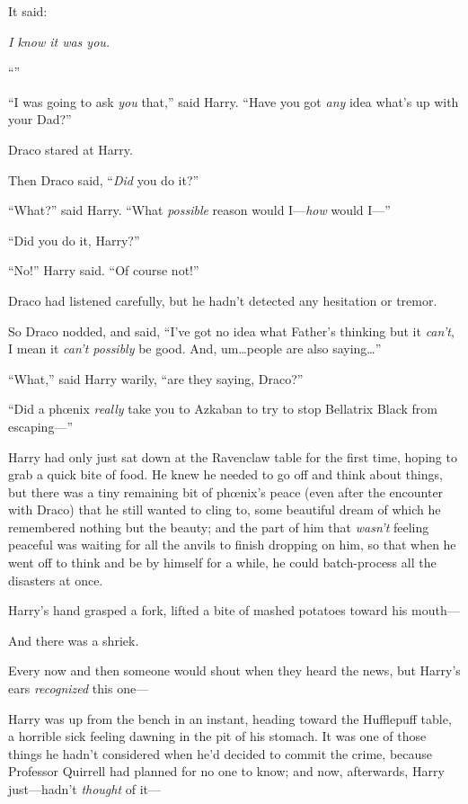 It said:

\emph{I know it was you.}

“\emph{}”

“I was going to ask \emph{you} that,” said Harry. “Have you got \emph{any} idea what’s up with your Dad?”

Draco stared at Harry.

Then Draco said, “\emph{Did} you do it?”

“What?” said Harry. “What \emph{possible} reason would I—\emph{how} would I—”

“Did you do it, Harry?”

“No!” Harry said. “Of course not!”

Draco had listened carefully, but he hadn’t detected any hesitation or tremor.

So Draco nodded, and said, “I’ve got no idea what Father’s thinking but it \emph{can’t}, I mean it \emph{can’t possibly} be good. And, um…people are also saying…”

“What,” said Harry warily, “are they saying, Draco?”

“Did a phœnix \emph{really} take you to Azkaban to try to stop Bellatrix Black from escaping—”


Harry had only just sat down at the Ravenclaw table for the first time, hoping to grab a quick bite of food. He knew he needed to go off and think about things, but there was a tiny remaining bit of phœnix’s peace (even after the encounter with Draco) that he still wanted to cling to, some beautiful dream of which he remembered nothing but the beauty; and the part of him that \emph{wasn’t} feeling peaceful was waiting for all the anvils to finish dropping on him, so that when he went off to think and be by himself for a while, he could batch-process all the disasters at once.

Harry’s hand grasped a fork, lifted a bite of mashed potatoes toward his mouth—

And there was a shriek.

Every now and then someone would shout when they heard the news, but Harry’s ears \emph{recognized} this one—

Harry was up from the bench in an instant, heading toward the Hufflepuff table, a horrible sick feeling dawning in the pit of his stomach. It was one of those things he hadn’t considered when he’d decided to commit the crime, because Professor Quirrell had planned for no one to know; and now, afterwards, Harry just—hadn’t \emph{thought} of it—

